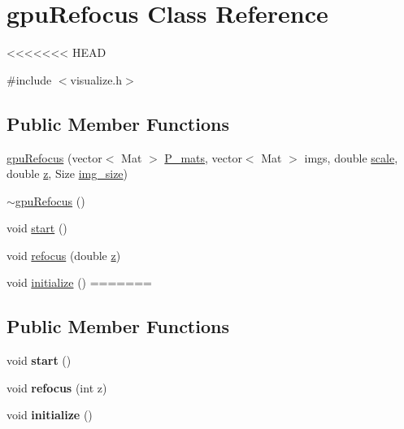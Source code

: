 \hypertarget{classgpuRefocus}{\section{gpu\-Refocus Class Reference}
\label{df/d10/classgpuRefocus}
}
<<<<<<< HEAD


{\ttfamily \#include $<$visualize.\-h$>$}

\subsection*{Public Member Functions}
\begin{DoxyCompactItemize}
\item 
\hyperlink{classgpuRefocus_ab2f0271a5c8cb33ee6d1e3ae5d78ed21}{gpu\-Refocus} (vector$<$ Mat $>$ \hyperlink{classgpuRefocus_a7e4bc1dd02a430a17f9d4f3762ba1818}{P\-\_\-mats}, vector$<$ Mat $>$ imgs, double \hyperlink{classgpuRefocus_a8cdaf53f83fcc39209277acc87b46209}{scale}, double \hyperlink{classgpuRefocus_ad8992176825beb8c6ddcc7b1a9b852bf}{z}, Size \hyperlink{classgpuRefocus_acee020e8efe2bf650c3e984e9e56d4d2}{img\-\_\-size})
\item 
\hyperlink{classgpuRefocus_a1f4f716c2408873fd1f25f47affee82d}{$\sim$gpu\-Refocus} ()
\item 
void \hyperlink{classgpuRefocus_a28d7d0f0604bd683069857b1face4e6e}{start} ()
\item 
void \hyperlink{classgpuRefocus_a0722e109830d8de6ff53c0e8e8f73891}{refocus} (double \hyperlink{classgpuRefocus_ad8992176825beb8c6ddcc7b1a9b852bf}{z})
\item 
void \hyperlink{classgpuRefocus_a656c1de1bf678f3250e01763ea5748ab}{initialize} ()
=======
\subsection*{Public Member Functions}
\begin{DoxyCompactItemize}
\item 
\hypertarget{classgpuRefocus_a28d7d0f0604bd683069857b1face4e6e}{void {\bfseries start} ()}\label{df/d10/classgpuRefocus_a28d7d0f0604bd683069857b1face4e6e}

\item 
\hypertarget{classgpuRefocus_a9041fc60d90067b009bb4591475ddf76}{void {\bfseries refocus} (int z)}\label{df/d10/classgpuRefocus_a9041fc60d90067b009bb4591475ddf76}

\item 
\hypertarget{classgpuRefocus_a656c1de1bf678f3250e01763ea5748ab}{void {\bfseries initialize} ()}\label{df/d10/classgpuRefocus_a656c1de1bf678f3250e01763ea5748ab}


\end{DoxyCompactItemize}
\end{DoxyCompactItemize}
